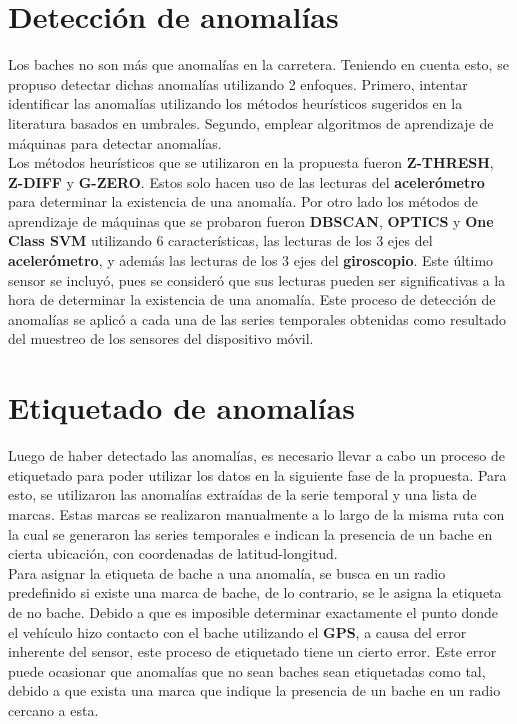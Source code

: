 \section{Detección de anomalías}
	Los baches no son más que anomalías en la carretera. Teniendo en cuenta esto, se propuso detectar dichas anomalías utilizando
	2 enfoques. Primero, intentar identificar las anomalías utilizando los métodos heurísticos sugeridos en la literatura basados
	en umbrales. Segundo, emplear algoritmos de aprendizaje de máquinas para detectar anomalías.\\
	\indent Los métodos heurísticos que se utilizaron en la propuesta fueron \textbf{Z-THRESH}, \textbf{Z-DIFF} y \textbf{G-ZERO}.
	Estos solo hacen uso de las lecturas del \textbf{acelerómetro} para determinar la existencia de una anomalía. Por otro lado los
	métodos de aprendizaje de máquinas que se probaron fueron \textbf{DBSCAN}, \textbf{OPTICS} y \textbf{One Class SVM} utilizando 
	6 características, las lecturas de los 3 ejes del \textbf{acelerómetro}, y además las lecturas de los 3 ejes del \textbf{giroscopio}.
	Este último sensor se incluyó, pues se consideró que sus lecturas pueden ser significativas a la hora de determinar la existencia de una 
	anomalía. Este proceso de detección de anomalías se aplicó a cada una de las series temporales obtenidas como resultado del muestreo
	de los sensores del dispositivo móvil.

\section{Etiquetado de anomalías}
	Luego de haber detectado las anomalías, es necesario llevar a cabo un proceso de etiquetado para poder utilizar los datos en la siguiente
	fase de la propuesta. Para esto, se utilizaron las anomalías extraídas de la serie temporal y una lista de marcas. Estas marcas se realizaron
	manualmente a lo largo de la misma ruta con la cual se generaron las series temporales e indican la presencia de un bache en cierta
	ubicación, con coordenadas de latitud-longitud.\\
	\indent Para asignar la etiqueta de bache a una anomalía, se busca en un radio predefinido si existe una marca de bache, de lo contrario, se le
	asigna la etiqueta de no bache. Debido a que es imposible determinar exactamente el punto donde el vehículo hizo contacto con el bache
	utilizando el \textbf{GPS}, a causa del error inherente del sensor, este proceso de etiquetado tiene un cierto error. Este error puede ocasionar
	que anomalías que no sean baches sean etiquetadas como tal, debido a que exista una marca que indique la presencia de un bache en un radio
	cercano a esta.

